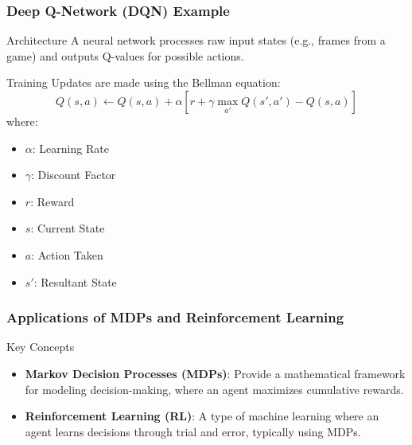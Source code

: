 \documentclass[aspectratio=169]{beamer}
\begin{document}
\begin{frame}[fragile]
    \frametitle{Deep Q-Network (DQN) Example}
    \begin{block}{Architecture}
        A neural network processes raw input states (e.g., frames from a game) and outputs Q-values for possible actions.
    \end{block}
    
    \begin{block}{Training}
        Updates are made using the Bellman equation:
        \begin{equation}
        Q(s, a) \leftarrow Q(s, a) + \alpha \left[ r + \gamma \max_{a'} Q(s', a') - Q(s, a) \right]
        \end{equation}
        where:
        \begin{itemize}
            \item $\alpha$: Learning Rate
            \item $\gamma$: Discount Factor
            \item $r$: Reward
            \item $s$: Current State
            \item $a$: Action Taken
            \item $s'$: Resultant State
        \end{itemize}
    \end{block}
\end{frame}

\begin{frame}[fragile]
    \frametitle{Applications of MDPs and Reinforcement Learning}
    \begin{block}{Key Concepts}
        \begin{itemize}
            \item \textbf{Markov Decision Processes (MDPs)}: Provide a mathematical framework for modeling decision-making, where an agent maximizes cumulative rewards.
            \item \textbf{Reinforcement Learning (RL)}: A type of machine learning where an agent learns decisions through trial and error, typically using MDPs.
        \end{itemize}
    \end{block}
\end{frame}
\end{document}
